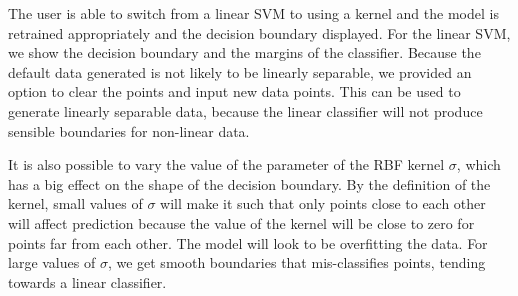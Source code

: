 \documentclass[11pt,letterpaper]{article}
\begin{document}
The user is able to switch from a linear SVM to using a kernel and the model is retrained appropriately and the decision boundary displayed. For the linear SVM, we show the decision boundary and the margins of the classifier. Because the default data generated is not likely to be linearly separable, we provided an option to clear the points and input new data points. This can be used to generate linearly separable data, because the linear classifier will not produce sensible boundaries for non-linear data.

It is also possible to vary the value of the parameter of the RBF kernel $\sigma$, which has a big effect on the shape of the decision boundary. By the definition of the kernel, small values of $\sigma$ will make it such that only points close to each other will affect prediction because the value of the kernel will be close to zero for points far from each other. The model will look to be overfitting the data. For large values of $\sigma$, we get smooth boundaries that mis-classifies points, tending towards a linear classifier.
\end{document}
